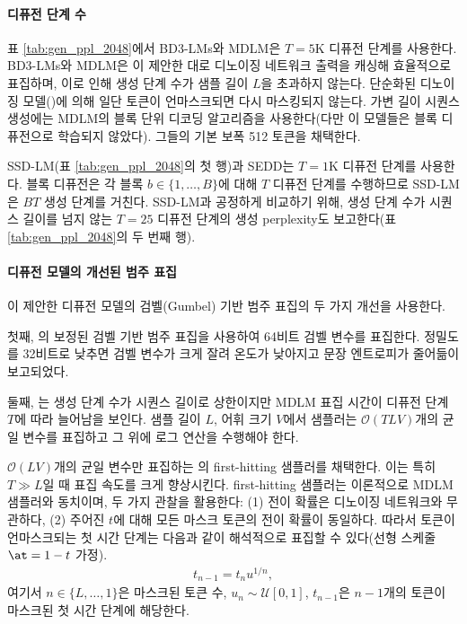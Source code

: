 \documentclass{article} %
\def\algos{BD3-LMs}
\begin{document}
     \paragraph{디퓨전 단계 수} 표 \ref{tab:gen_ppl_2048}에서 \algos{}와 MDLM은 $T=5$K 디퓨전 단계를 사용한다. \algos{}와 MDLM은 \citet{sahoo2024simple, ou2025your}이 제안한 대로 디노이징 네트워크 출력을 캐싱해 효율적으로 표집하며, 이로 인해 생성 단계 수가 샘플 길이 $L$을 초과하지 않는다. 단순화된 디노이징 모델()에 의해 일단 토큰이 언마스크되면 다시 마스킹되지 않는다. 가변 길이 시퀀스 생성에는 MDLM의 블록 단위 디코딩 알고리즘을 사용한다(다만 이 모델들은 블록 디퓨전으로 학습되지 않았다). 그들의 기본 보폭 512 토큰을 채택한다.

   SSD-LM(표 \ref{tab:gen_ppl_2048}의 첫 행)과 SEDD는 $T=1$K 디퓨전 단계를 사용한다. 블록 디퓨전은 각 블록 $b \in \{ 1, \dots, B \}$에 대해 $T$ 디퓨전 단계를 수행하므로 SSD-LM은 $BT$ 생성 단계를 거친다. SSD-LM과 공정하게 비교하기 위해, 생성 단계 수가 시퀀스 길이를 넘지 않는 $T=25$ 디퓨전 단계의 생성 perplexity도 보고한다(표 \ref{tab:gen_ppl_2048}의 두 번째 행).

   \paragraph{디퓨전 모델의 개선된 범주 표집} \citet{zheng2024masked}이 제안한 디퓨전 모델의 검벨(Gumbel) 기반 범주 표집의 두 가지 개선을 사용한다.

   첫째, \citet{zheng2024masked}의 보정된 검벨 기반 범주 표집을 사용하여 64비트 검벨 변수를 표집한다. 정밀도를 32비트로 낮추면 검벨 변수가 크게 잘려 온도가 낮아지고 문장 엔트로피가 줄어듦이 보고되었다.

   둘째, \citet{zheng2024masked}는 생성 단계 수가 시퀀스 길이로 상한이지만 MDLM 표집 시간이 디퓨전 단계 $T$에 따라 늘어남을 보인다. 샘플 길이 $L$, 어휘 크기 $V$에서 샘플러는 $\mathcal{O}(T L V)$개의 균일 변수를 표집하고 그 위에 로그 연산을 수행해야 한다.

   $\mathcal{O}(L V)$개의 균일 변수만 표집하는 \citet{zheng2024masked}의 first-hitting 샘플러를 채택한다. 이는 특히 $T \gg L$일 때 표집 속도를 크게 향상시킨다. first-hitting 샘플러는 이론적으로 MDLM 샘플러와 동치이며, 두 가지 관찰을 활용한다: (1) 전이 확률은 디노이징 네트워크와 무관하다, (2) 주어진 $t$에 대해 모든 마스크 토큰의 전이 확률이 동일하다. 따라서 토큰이 언마스크되는 첫 시간 단계는 다음과 같이 해석적으로 표집할 수 있다(선형 스케줄 $\at = 1 - t$ 가정).
   \begin{align}
       t_{n-1} = t_n u^{1 / n},
   \end{align}
   \noindent 여기서 $n \in \{ L, \dots, 1\}$은 마스크된 토큰 수, $u_n \sim \mathcal{U}[0,1]$, $t_{n-1}$은 $n-1$개의 토큰이 마스크된 첫 시간 단계에 해당한다.
\end{document}
